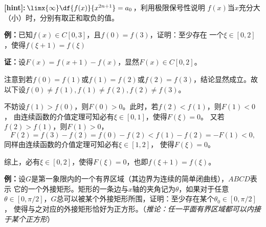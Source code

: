 {\bf [hint]:}$\limx{\infty}\df{f(x)}{x^{2n+1}}=a_0$，利用极限保号性说明
$f(x)$当$x$充分大（小）时，分别有取正和取负的值。

{\bf 例：}已知$f(x)\in C[0,3]$，且$f(0)=f(3)$，证明：至少存在
一个$\xi\in[0,2]$，使得$f(\xi+1)=f(\xi)$

{\bf 证：}设$F(x)=f(x+1)-f(x)$，显然$F(x)\in C[0,2]$。

注意到若$f(0)=f(1)$或$f(1)=f(2)$或$f(2)=f(3)$，结论显然成立。故以下设$f(0)\ne f(1),
f(1)\ne f(2),f(2)\ne f(3)$。

不妨设$f(1)>f(0)$，则$F(0)>0$。此时，若$f(2)<f(1)$，则$F(1)<0$，
由连续函数的介值定理可知必有$\xi\in[0,1]$，使得$F(\xi)=0$。
又若$f(2)>f(1)$，则$F(1)>0$，
$$F(2)=f(3)-f(2)=f(0)-f(2)<f(1)-f(2)=-F(1)<0,$$
同样由连续函数的介值定理可知必有$\xi\in[1,2]$，
使得$F(\xi)=0$。

综上，必有$\xi\in[0,2]$，使得$F(\xi)=0$，也即$f(\xi+1)=f(\xi)$。

{\bf 例：}设$G$是第一象限内的一个有界区域（其边界为连续的简单闭曲线），$ABCD$表示
它的一个外接矩形。矩形的一条边与$x$轴的夹角记为$\theta$，如果对于任意$\theta\in
[0,\pi/2]$，$G$总可以被某个外接矩形所围，证明：至少存在某个$\theta_0\in[0,\pi/2]$，
使得与之对应的外接矩形恰好为正方形。（{\it 推论：任一平面有界区域都可以内接于某个正方形}）

\begin{center}
\end{center}


